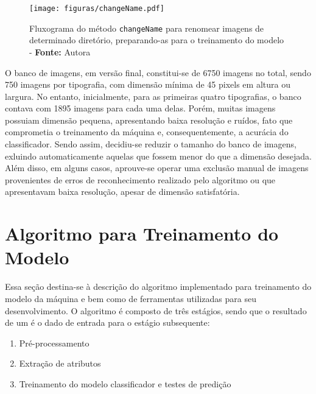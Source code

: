 \begin{figure}[H]
  \centering
  \texttt{[image: figuras/changeName.pdf]}
  \caption{Fluxograma do método \texttt{changeName} para renomear imagens de determinado diretório, preparando-as para o treinamento do modelo - \textbf{Fonte:} Autora}
  \label{fig:flowchangeName}
\end{figure}

O banco de imagens, em versão final, constitui-se de 6750 imagens no total, sendo 750 imagens por tipografia, com dimensão mínima de 45 pixels em altura ou largura. No entanto, inicialmente, para as primeiras quatro tipografias, o banco contava com 1895 imagens para cada uma delas. Porém, muitas imagens possuiam dimensão pequena, apresentando baixa resolução e ruídos, fato que comprometia o treinamento da máquina e, consequentemente, a acurácia do classificador. Sendo assim, decidiu-se reduzir o tamanho do banco de imagens, exluindo automaticamente aquelas que fossem menor do que a dimensão desejada. Além disso, em alguns casos, aprouve-se operar uma exclusão manual de imagens provenientes de erros de reconhecimento realizado pelo algoritmo ou que apresentavam baixa resolução, apesar de dimensão satisfatória.




\section{Algoritmo para Treinamento do Modelo}

Essa seção destina-se à descrição do algoritmo implementado para treinamento do modelo da máquina e bem como de ferramentas utilizadas para seu desenvolvimento. O algoritmo é composto de três estágios, sendo que o resultado de um é o dado de entrada para o estágio subsequente:

\begin{enumerate}
\item Pré-processamento
\item Extração de atributos
\item Treinamento do modelo classificador e testes de predição
\end{enumerate}

